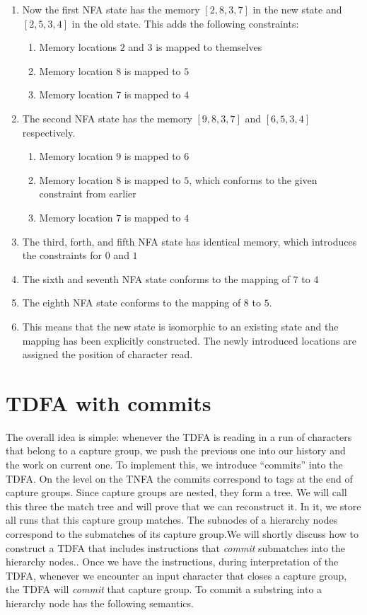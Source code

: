 \documentclass[english]{sigplanconf}
\theoremstyle{definition}
\begin{document}
\begin{enumerate}
\begin{enumerate}
\item Now the first NFA state has the memory $[2,8,3,7]$ in the new state
and $[2,5,3,4]$ in the old state. This adds the following constraints:

\begin{enumerate}
\item Memory locations $2$ and $3$ is mapped to themselves
\item Memory location $8$ is mapped to $5$
\item Memory location $7$ is mapped to $4$
\end{enumerate}
\item The second NFA state has the memory $[9,8,3,7]$ and $[6,5,3,4]$
respectively.

\begin{enumerate}
\item Memory location $9$ is mapped to $6$
\item Memory location $8$ is mapped to $5$, which conforms to the given
constraint from earlier
\item Memory location $7$ is mapped to $4$
\end{enumerate}
\item The third, forth, and fifth NFA state has identical memory, which
introduces the constraints for $0$ and $1$
\item The sixth and seventh NFA state conforms to the mapping of $7$ to
$4$
\item The eighth NFA state conforms to the mapping of $8$ to $5$.
\item This means that the new state is isomorphic to an existing state and
the mapping has been explicitly constructed. The newly introduced
locations are assigned the position of character read.
\end{enumerate}
\end{enumerate}

\section{TDFA with commits\label{sec:TNFA-with-hierarchical}}

The overall idea is simple: whenever the TDFA is reading in a run
of characters that belong to a capture group, we push the previous
one into our history and the work on current one. To implement this,
we introduce ``commits'' into the TDFA. On the level on the TNFA
the commits correspond to tags at the end of capture groups. Since
capture groups are nested, they form a tree. We will call this three
the match tree and will prove that we can reconstruct it. In it, we
store all runs that this capture group matches. The subnodes of a
hierarchy nodes correspond to the submatches of its capture group.We
will shortly discuss how to construct a TDFA that includes instructions
that \emph{commit} submatches into the hierarchy nodes.. Once we have
the instructions, during interpretation of the TDFA, whenever we encounter
an input character that closes a capture group, the TDFA will \emph{commit}
that capture group. To commit a substring into a hierarchy node has
the following semantics.
\end{document}
